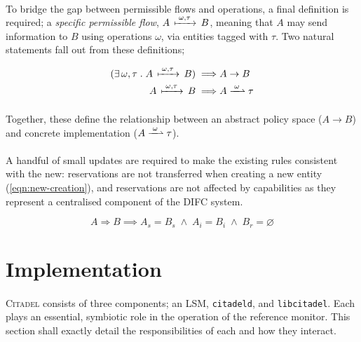 \paragraph{} To bridge the gap between permissible flows and operations, a final definition is required; a \textit{specific permissible flow}, $A \,\xmapsto{\;\omega,\tau\;}\, B$, meaning that $A$ may send information to $B$ using operations $\omega$, via entities tagged with $\tau$. Two natural statements fall out from these definitions;

\vspace{-7mm}
\begin{align}
    (\exists\, \omega,\tau \;.\; A \,\xmapsto{\;\omega,\tau\;}\, B) \implies & A \rightarrow B \\
    A \,\xmapsto{\;\omega,\tau\;}\, B \implies & A \xrightharpoonup{\;\omega\;} \tau \label{eqn:flow-abs-conc-map}
\end{align}

\paragraph{} Together, these define the relationship between an abstract policy space ($A \rightarrow B$) and concrete implementation ($A \xrightharpoonup{\;\omega\;} \tau$).

\paragraph{} A handful of small updates are required to make the existing rules consistent with the new: reservations are not transferred when creating a new entity (\ref{eqn:new-creation}), and reservations are not affected by capabilities as they represent a centralised component of the DIFC system. 

\vspace{-5mm}
\begin{equation}
    A \Rightarrow B \implies A_s = B_s \; \wedge \; A_i = B_i \; \wedge \; B_r = \varnothing \label{eqn:new-creation}
\end{equation}

\clearpage
\section{Implementation}

\paragraph{} \textsc{Citadel} consists of three components; an LSM, \texttt{citadeld}, and \texttt{libcitadel}. Each plays an essential, symbiotic role in the operation of the reference monitor. This section shall exactly detail the responsibilities of each and how they interact.

